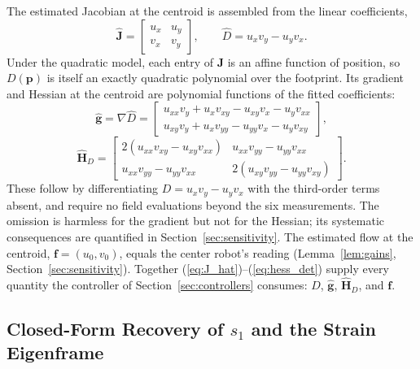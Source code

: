 \documentclass[lettersize,journal]{IEEEtran}
\begin{document}
The estimated Jacobian at the centroid is assembled from the linear
coefficients,
\begin{equation}
    \hat{\mathbf{J}} =
    \begin{bmatrix} u_x & u_y \\ v_x & v_y \end{bmatrix},
    \qquad
    \hat{D} = u_x v_y - u_y v_x.
    \label{eq:J_hat}
\end{equation}
Under the quadratic model, each entry of $\mathbf{J}$ is an affine
function of position, so $D(\mathbf{p})$ is itself an exactly quadratic
polynomial over the footprint. Its gradient and Hessian at the centroid
are polynomial functions of the fitted coefficients:
\begin{equation}
    \hat{\mathbf{g}} = \nabla \hat{D} =
    \begin{bmatrix}
        u_{xx} v_y + u_x v_{xy} - u_{xy} v_x - u_y v_{xx} \\
        u_{xy} v_y + u_x v_{yy} - u_{yy} v_x - u_y v_{xy}
    \end{bmatrix},
    \label{eq:grad_det}
\end{equation}
\begin{equation}
    \hat{\mathbf{H}}_D =
    \begin{bmatrix}
        2(u_{xx} v_{xy} - u_{xy} v_{xx}) &
        u_{xx} v_{yy} - u_{yy} v_{xx} \\
        u_{xx} v_{yy} - u_{yy} v_{xx} &
        2(u_{xy} v_{yy} - u_{yy} v_{xy})
    \end{bmatrix}.
    \label{eq:hess_det}
\end{equation}
These follow by differentiating $D = u_x v_y - u_y v_x$ with the
third-order terms absent, and require no field evaluations beyond the six
measurements. The omission is harmless for the gradient but not for the
Hessian; its systematic consequences are quantified in
Section~\ref{sec:sensitivity}. The estimated flow at the centroid,
$\mathbf{f} = (u_0, v_0)$, equals the center robot's reading
(Lemma~\ref{lem:gains}, Section~\ref{sec:sensitivity}). Together
(\ref{eq:J_hat})--(\ref{eq:hess_det}) supply every quantity the
controller of Section~\ref{sec:controllers} consumes: $\hat{D}$,
$\hat{\mathbf{g}}$, $\hat{\mathbf{H}}_D$, and $\mathbf{f}$.

\subsection{Closed-Form Recovery of $s_1$ and the Strain Eigenframe}
\label{sec:s1_estimation}
\end{document}
